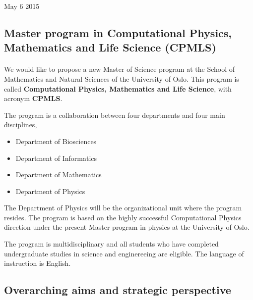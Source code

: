 \documentclass[%
twoside,                 %
final,                   %
10pt]{article}
\begin{document}
\begin{center} %
May 6 2015
\end{center}

\vspace{1cm}


\subsection*{Master program in Computational Physics, Mathematics and Life Science (CPMLS)}

\paragraph{}
We would like to propose a new Master of Science program at the School of Mathematics and Natural Sciences of the University of Oslo. This program is called  \textbf{Computational Physics, Mathematics and Life Science}, with acronym  \textbf{CPMLS}. 

The program is a collaboration between four departments and four main disciplines,
\begin{itemize}
\item Department of Biosciences 

\item Department of Informatics

\item Department of Mathematics 

\item Department of Physics 
\end{itemize}

\noindent
The Department of Physics will be the organizational unit where the program resides. 
The program is based on the highly successful Computational Physics direction under the present Master program
in physics at the University of Oslo. 

The program is multidisciplinary and all students who have completed undergraduate studies in science and enginereeing are eligible.  The language of instruction is English.







\subsection*{Overarching aims and strategic perspective}
\end{document}
